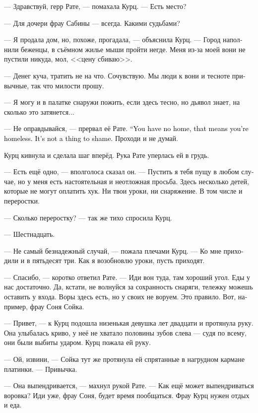 \documentclass[a4paper,12pt,fleqn]{book}\usepackage{cooltooltips}\usepackage{polyglossia}\setdefaultlanguage[babelshorthands=true]{russian}\setotherlanguage{english}\defaultfontfeatures{Ligatures=TeX,Mapping=tex-text} \usepackage{xcolor}\definecolor{lightgray}{HTML}{bbbbbb}\color{lightgray}\newcommand{\ml}[3]{\textenglish{\textcolor{black}{#3}}}
\begin{document}
--- Здравствуй, герр Рате, --- помахала Курц.
--- Есть место?

--- Для дочери фрау Сабины --- всегда.
Какими судьбами?

--- Я продала дом, но, похоже, прогадала, --- объяснила Курц.
--- Город наполнили беженцы, в съёмном жилье мыши пройти негде.
Меня из-за моей вони не пустили никуда, мол, <<цену сбиваю>>.

--- Денег куча, тратить не на что.
Сочувствую.
Мы люди к вони и тесноте привычные, так что милости прошу.

--- Я могу и в палатке снаружи пожить, если здесь тесно, но дьявол знает, на сколько это затянется...

--- Не оправдывайся, --- прервал её Рате.
\ml{$0$}
{--- Без дома --- значит, без дома.}
{``You have no home, that means you're homeless.}
\ml{$0$}
{Ничего зазорного в этом нет.}
{It's not a thing to shame.}
Проходи и не думай.

Курц кивнула и сделала шаг вперёд.
Рука Рате уперлась ей в грудь.

--- Есть ещё одно, --- вполголоса сказал он.
--- Пустить я тебя пущу в любом случае, но у меня есть настоятельная и неотложная просьба.
Здесь несколько детей, которые не могут оплатить хук.
Ни твои уроки, ни снаряжение.
В том числе и переростки.

--- Сколько переростку? --- так же тихо спросила Курц.

--- Шестнадцать.

--- Не самый безнадежный случай, --- пожала плечами Курц.
--- Ко мне приходили и в пятьдесят три.
Как я возобновлю уроки, пусть приходят.

--- Спасибо, --- коротко ответил Рате.
--- Иди вон туда, там хороший угол.
Еды у нас достаточно.
Да, кстати, не волнуйся за сохранность снаряги, тележку можешь оставить у входа.
Воры здесь есть, но у своих не воруем.
Это правило.
Вот, например, фрау Соня Сойка.

--- Привет, --- к Курц подошла низенькая девушка лет двадцати и протянула руку.
Она улыбалась криво, у неё не хватало половины зубов слева --- судя по всему, они были выбиты ударом.
Курц пожала ей руку.

--- Ой, извини, --- Сойка тут же протянула ей спрятанные в нагрудном кармане платинки.
--- Привычка.

--- Она выпендривается, --- махнул рукой Рате.
--- Как ещё может выпендриваться воровка?
Иди уже, фрау Соня, будет время пообщаться.
Фрау Курц нужен отдых и еда.
\end{document}
